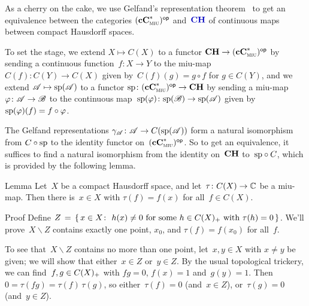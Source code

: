\documentclass[a]{subfiles}
\begin{document}
\begin{parsec}%
\begin{point}%
As a cherry on the cake,
we use Gelfand's representation theorem~
to get an equivalence between the categories ${(\mathbf{cC}^*_{\text{\textsc{miu}}})}{^{\mathsf{op}}}$
and~$\Define{\CH}$%
of continuous maps between compact Hausdorff spaces.

To set the stage,
we extend $X\mapsto C(X)$ to a functor
$\mathbf{CH}\to {(\mathbf{cC}^*_{\text{\textsc{miu}}})}{^{\mathsf{op}}}$
by sending a continuous function~$f\colon X\to Y$
to the miu-map $C(f)\colon C(Y)\to C(X)$
given by~$C(f)(g)=g\circ f$ for $g\in C(Y)$,
and we extend $\mathscr{A}\mapsto \mathrm{sp}(\mathscr{A})$
to a functor $\mathrm{sp}\colon {(\mathbf{cC}^*_{\text{\textsc{miu}}})}{^{\mathsf{op}}}\to \mathbf{CH}$
by sending a miu-map $\varphi \colon \mathscr{A}\to\mathscr{B}$
to the continuous map~$\mathrm{sp}(\varphi)\colon \mathrm{sp}(\mathscr{B})\to\mathrm{sp}(\mathscr{A})$
given by~$\mathrm{sp}(\varphi)(f)=f\circ \varphi$.

The Gelfand representations $\gamma_{\mathscr{A}}\colon \mathscr{A}\to C(\mathrm{sp}(\mathscr{A}))$
form a natural isomorphism
from $C\circ \mathrm{sp}$ to the identity functor on~${(\mathbf{cC}^*_{\text{\textsc{miu}}})}{^{\mathsf{op}}}$.
So to get an equivalence,
it suffices to find a natural isomorphism
from the identity on~$\mathbf{CH}$ to~$\mathrm{sp}\circ C$,
which is provided by the following lemma.
\end{point}
\begin{point}{Lemma}%
Let~$X$ be a compact Hausdorff space,
and let~$\tau \colon C(X)\to \mathbb{C}$ be a miu-map.
Then there is~$x\in X$ with $\tau(f)=f (x)$
for all~$f\in C(X)$.
\begin{point}{Proof}%
Define
$Z\,= \, \{\,x\in X\colon \ h(x)\neq 0\text{ for some~$h\in C(X)_{+}$
with $\tau(h)=0$}\,\}$.
We'll prove~$X\backslash Z$ contains
exactly one point, $x_0$, and $\tau(f)=f(x_0)$ for all~$f$.
\begin{point}%
To see that~$X\backslash Z$ contains no more than one point,
let~$x,y\in X$ with $x\neq y$ be given;
we will show that either~$x\in Z$ or~$y\in Z$.
By the usual topological trickery,
we can find~$f,g\in C(X)_{+}$
with $fg=0$, $f(x)=1$ and~$g(y)=1$.
Then~$0=\tau(fg)=\tau(f)\,\tau(g)$,
so either~$\tau(f)=0$ (and~$x\in Z$), or~$\tau(g)=0$
(and~$y\in Z$).


\end{point}
\end{point}
\end{point}
\end{parsec}
\end{document}
